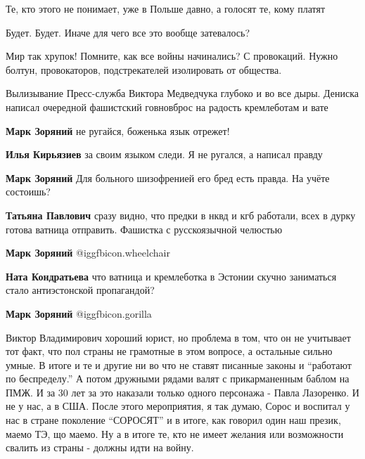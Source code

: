 \begin{itemize}
Те, кто этого не понимает, уже в Польше давно, а голосят те, кому платят

Будет. Будет. Иначе для чего все это вообще затевалось?

Мир так хрупок! Помните, как все войны начинались?
С провокаций. Нужно болтун, провокаторов, подстрекателей изолировать от общества.


Вылизывание Пресс-служба Виктора Медведчука глубоко и во все дыры. Дениска
написал очередной фашистский говновброс на радость кремлеботам и вате

\begin{itemize} %
\textbf{Марк Зоряний} не ругайся, боженька язык отрежет!

\textbf{Илья Кирьязиев} за своим языком следи. Я не ругался, а написал правду

\textbf{Марк Зоряний} Для больного шизофренией его бред есть правда. На учёте состоишь?

\textbf{Татьяна Павлович} сразу видно, что предки в нквд и кгб работали, всех в дурку готова ватница отправить. Фашистка с русскоязычной челюстью

\textbf{Марк Зоряний}  @igg{fbicon.wheelchair} 

\textbf{Ната Кондратьева} что ватница и кремлеботка в Эстонии скучно заниматься стало антиэстонской пропагандой?

\textbf{Марк Зоряний}  @igg{fbicon.gorilla} 
\end{itemize} %


Виктор Владимирович хороший юрист, но проблема в том, что он не учитывает тот
факт, что пол страны не грамотные в этом вопросе, а остальные сильно умные. В
итоге и те и другие ни во что не ставят писанные законы и \enquote{работают по
беспределу.} А потом дружными рядами валят с прикарманенным баблом на ПМЖ. И за
30 лет за это наказали только одного персонажа - Павла Лазоренко. И не у нас, а
в США. После этого мероприятия, я так думаю, Сорос и воспитал у нас в стране
поколение \enquote{СОРОСЯТ} и в итоге, как говорил один наш презик, маемо ТЭ, що маемо.
Ну а в итоге те, кто не имеет желания или возможности свалить из страны -
должны идти на войну.




\end{itemize}
